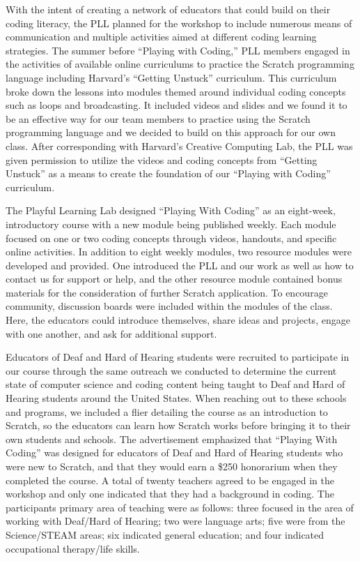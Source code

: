 \documentclass[11.5pt]{sig-alternate} %
\begin{document}
\begin{large}
With the intent of creating a network of educators that could build on their coding literacy, the PLL planned for the workshop to include numerous means of communication and multiple activities aimed at different coding learning strategies. The summer before “Playing with Coding,” PLL members engaged in the activities of available online curriculums to practice the Scratch programming language including Harvard’s “Getting Unstuck” curriculum. This curriculum broke down the lessons into modules themed around individual coding concepts such as loops and broadcasting. It included videos and slides and we found it to be an effective way for our team members to practice using the Scratch programming language and we decided to build on this approach for our own class. After corresponding with Harvard’s Creative Computing Lab, the PLL was given permission to utilize the videos and coding concepts from “Getting Unstuck” as a means to create the foundation of our “Playing with Coding” curriculum. 

The Playful Learning Lab designed “Playing With Coding” as an eight-week, introductory course with a new module being published weekly. Each module focused on one or two coding concepts through videos, handouts, and specific online activities. In addition to eight weekly modules, two resource modules were developed and provided. One introduced the PLL and our work as well as  how to contact us for support or help, and the other resource module contained bonus materials for the consideration of further Scratch application. To encourage community, discussion boards were included within the modules of the class. Here, the educators could introduce themselves, share ideas and projects, engage with one another, and ask for additional support.  

Educators of Deaf and Hard of Hearing students were recruited to participate in our course through the same outreach we conducted to determine the current state of computer science and coding content being taught to Deaf and Hard of Hearing students around the United States. When reaching out to these schools and programs, we included a flier detailing the course as an introduction to Scratch, so the educators can learn how Scratch works before bringing it to their own students and schools. The advertisement emphasized that “Playing With Coding” was designed for educators of Deaf and Hard of Hearing students who were new to Scratch, and that they would earn a \$250 honorarium when they completed the course. A total of twenty teachers agreed to be engaged in the workshop and only one indicated that they had a background in coding. The participants primary area of teaching were as follows: three focused in the area of working with Deaf/Hard of Hearing; two were language arts; five were from the Science/STEAM areas; six indicated general education; and four indicated occupational therapy/life skills.


\end{large}
\end{document}
